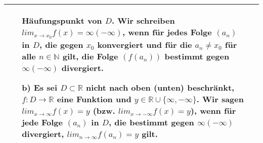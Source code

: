 \begin{table}[H]
\begin{tabularx}{\textwidth}{X m{16cm}}
\begin{itemize}[topsep=-0.5cm]
                                Häufungspunkt von $D$. Wir schreiben $lim_{x \rightarrow x_0}f(x) = \infty (-\infty)$, wenn
                                für jedes Folge $(a_n)$ in $D$, die gegen $x_0$ konvergiert und für die $a_n \neq x_0$ für 
                                alle $n \in \mathbb{N}$ gilt, die Folge $(f(a_n))$ bestimmt gegen $\infty (-\infty)$ divergiert.
                    \item[b)] Es sei $D \subset \mathbb{R}$ \textbf{nicht} nach oben (unten) \textbf{beschränkt}, 
                                $f : D \rightarrow \mathbb{R}$ eine Funktion und $y \in \mathbb{R} \cup \{\infty,-\infty\}$. 
                                Wir sagen $lim_{x \rightarrow \infty} f(x) = y$ (bzw. $lim_{x \rightarrow -\infty} f(x) = y$),
                                wenn für jede Folge $(a_n)$ in $D$, die bestimmt gegen $\infty (-\infty)$ divergiert,
                                $lim_{n \rightarrow \infty} f(a_n) = y$ gilt.
                \end{itemize} \vspace{-0cm} \\

        \bottomrule

    \end{tabularx}
    \end{table}

